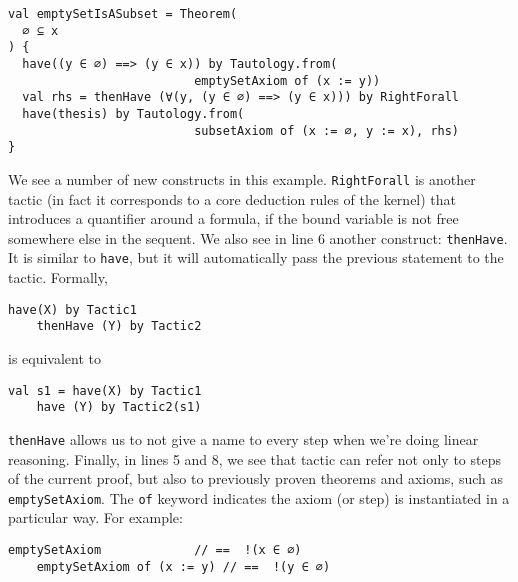 \noindent\begin{minipage}{\linewidth}\vspace{1em}
  \begin{lstlisting}[language=lisa, frame=single]
val emptySetIsASubset = Theorem(
  ∅ ⊆ x
) {
  have((y ∈ ∅) ==> (y ∈ x)) by Tautology.from(
                          emptySetAxiom of (x := y))
  val rhs = thenHave (∀(y, (y ∈ ∅) ==> (y ∈ x))) by RightForall
  have(thesis) by Tautology.from(
                          subsetAxiom of (x := ∅, y := x), rhs)
}
  \end{lstlisting}
\end{minipage}
We see a number of new constructs in this example. \lstinline|RightForall| is another tactic (in fact it corresponds to a core deduction rules of the kernel) that introduces a quantifier around a formula, if the bound variable is not free somewhere else in the sequent.
We also see in line 6 another construct: \lstinline|thenHave|. It is similar to \lstinline|have|, but it will automatically pass the previous statement to the tactic. Formally,
\noindent\begin{minipage}{\linewidth}\vspace{1em}
  \begin{lstlisting}[language=lisa, frame=single]
    have(X) by Tactic1
    thenHave (Y) by Tactic2
  \end{lstlisting}
\end{minipage}
is equivalent to

\noindent\begin{minipage}{\linewidth}\vspace{1em}
  \begin{lstlisting}[language=lisa, frame=single]
    val s1 = have(X) by Tactic1
    have (Y) by Tactic2(s1)
  \end{lstlisting}
\end{minipage}
\lstinline|thenHave| allows us to not give a name to every step when we're doing linear reasoning. Finally, in lines 5 and 8, we see that tactic can refer not only to steps of the current proof, but also to previously proven theorems and axioms, such as \lstinline|emptySetAxiom|. The \lstinline|of| keyword indicates the axiom (or step) is instantiated in a particular way. For example:
\noindent\begin{minipage}{\linewidth}\vspace{1em}
  \begin{lstlisting}[language=lisa, frame=single]
    emptySetAxiom             // ==  !(x ∈ ∅)
    emptySetAxiom of (x := y) // ==  !(y ∈ ∅)
  \end{lstlisting}
\end{minipage}

